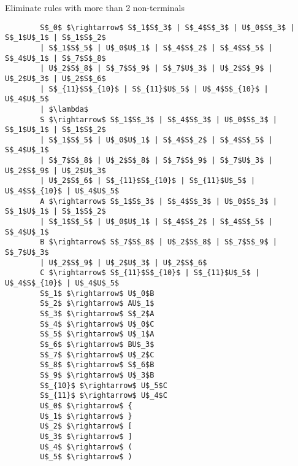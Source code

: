 \documentclass[11pt letter]{article}
\begin{document}
    Eliminate rules with more than 2 non-terminals
    \begin{lstlisting}
        S$_0$ $\rightarrow$ S$_1$S$_3$ | S$_4$S$_3$ | U$_0$S$_3$ | S$_1$U$_1$ | S$_1$S$_2$
        | S$_1$S$_5$ | U$_0$U$_1$ | S$_4$S$_2$ | S$_4$S$_5$ | S$_4$U$_1$ | S$_7$S$_8$
        | U$_2$S$_8$ | S$_7$S$_9$ | S$_7$U$_3$ | U$_2$S$_9$ | U$_2$U$_3$ | U$_2$S$_6$
        | S$_{11}$S$_{10}$ | S$_{11}$U$_5$ | U$_4$S$_{10}$ | U$_4$U$_5$
        | $\lambda$
        S $\rightarrow$ S$_1$S$_3$ | S$_4$S$_3$ | U$_0$S$_3$ | S$_1$U$_1$ | S$_1$S$_2$
        | S$_1$S$_5$ | U$_0$U$_1$ | S$_4$S$_2$ | S$_4$S$_5$ | S$_4$U$_1$
        | S$_7$S$_8$ | U$_2$S$_8$ | S$_7$S$_9$ | S$_7$U$_3$ | U$_2$S$_9$ | U$_2$U$_3$
        | U$_2$S$_6$ | S$_{11}$S$_{10}$ | S$_{11}$U$_5$ | U$_4$S$_{10}$ | U$_4$U$_5$
        A $\rightarrow$ S$_1$S$_3$ | S$_4$S$_3$ | U$_0$S$_3$ | S$_1$U$_1$ | S$_1$S$_2$
        | S$_1$S$_5$ | U$_0$U$_1$ | S$_4$S$_2$ | S$_4$S$_5$ | S$_4$U$_1$
        B $\rightarrow$ S$_7$S$_8$ | U$_2$S$_8$ | S$_7$S$_9$ | S$_7$U$_3$
        | U$_2$S$_9$ | U$_2$U$_3$ | U$_2$S$_6$
        C $\rightarrow$ S$_{11}$S$_{10}$ | S$_{11}$U$_5$ | U$_4$S$_{10}$ | U$_4$U$_5$
        S$_1$ $\rightarrow$ U$_0$B
        S$_2$ $\rightarrow$ AU$_1$
        S$_3$ $\rightarrow$ S$_2$A
        S$_4$ $\rightarrow$ U$_0$C
        S$_5$ $\rightarrow$ U$_1$A
        S$_6$ $\rightarrow$ BU$_3$
        S$_7$ $\rightarrow$ U$_2$C
        S$_8$ $\rightarrow$ S$_6$B
        S$_9$ $\rightarrow$ U$_3$B
        S$_{10}$ $\rightarrow$ U$_5$C
        S$_{11}$ $\rightarrow$ U$_4$C
        U$_0$ $\rightarrow$ {
        U$_1$ $\rightarrow$ }
        U$_2$ $\rightarrow$ [
        U$_3$ $\rightarrow$ ]
        U$_4$ $\rightarrow$ (
        U$_5$ $\rightarrow$ )
    \end{lstlisting}
\end{document}
